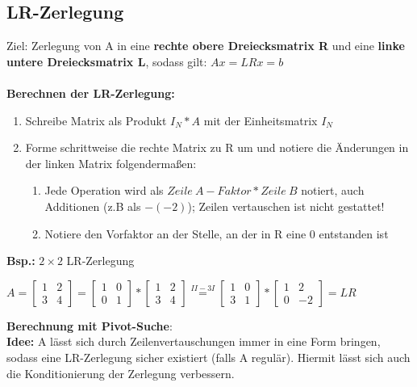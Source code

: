 \documentclass[10pt,a4paper]{article}
\newcommand{\rom}[1]{\uppercase\expandafter{\romannumeral #1\relax}}
\begin{document}
	\subsection{LR-Zerlegung}
	Ziel: Zerlegung von A in eine \textbf{rechte obere Dreiecksmatrix R} und eine \textbf{linke untere Dreiecksmatrix L}, sodass gilt: $Ax = LRx = b$\\\\
	\textbf{Berechnen der LR-Zerlegung:}
	\begin{enumerate}
		\item Schreibe Matrix als Produkt $I_N * A$ mit der Einheitsmatrix $I_N$
		\item Forme schrittweise die rechte Matrix zu R um und notiere die Änderungen in der linken Matrix folgendermaßen:
		\begin{enumerate}
			\item Jede Operation wird als $Zeile\ A - Faktor * Zeile\ B$ notiert, auch\\
			Additionen (z.B als \rom{2}$ - (-2)$\rom{1}); Zeilen vertauschen ist nicht gestattet!
			\item Notiere den Vorfaktor an der Stelle, an der in R eine 0 entstanden ist
		\end{enumerate}
	\end{enumerate}
	\textbf{Bsp.:} $2\times2$ LR-Zerlegung
	\begin{center}
		$A = 
		\begin{bmatrix}1 & 2 \\ 3 & 4\end{bmatrix} =
		\begin{bmatrix}1 & 0 \\ 0 & 1\end{bmatrix} * \begin{bmatrix}1 & 2 \\ 3 & 4\end{bmatrix} \stackrel{II - 3I}{=}
		\begin{bmatrix}1 & 0 \\ 3 & 1\end{bmatrix} * \begin{bmatrix}1 & 2 \\ 0 & -2\end{bmatrix} = LR
		$	
	\end{center}
	\textbf{Berechnung mit Pivot-Suche}:\\
	\textbf{Idee:} A lässt sich durch Zeilenvertauschungen immer in eine Form bringen, sodass eine LR-Zerlegung sicher existiert (falls A regulär). Hiermit lässt sich auch die Konditionierung der Zerlegung verbessern.\\\\
\end{document}
